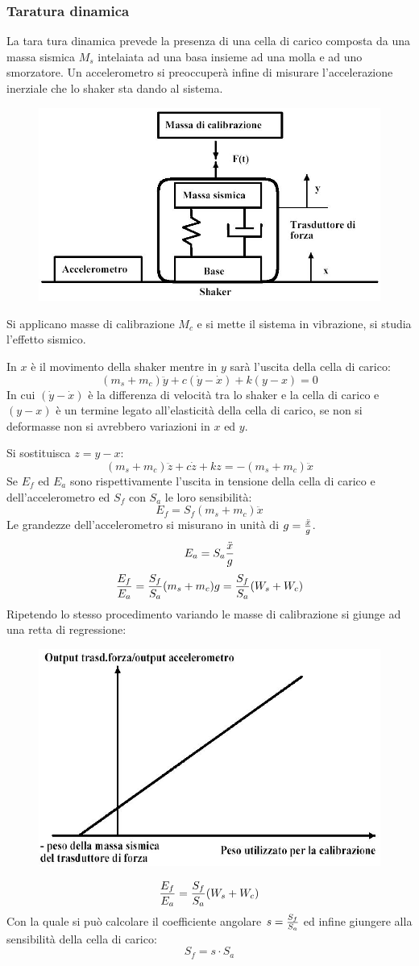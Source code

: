 \documentclass[a4paper, 15pt]{article}
\begin{document}
\subsubsection{Taratura dinamica}			
\begin{adjustwidth}{2in}{}
  		La tara tura dinamica prevede la presenza di una cella di carico composta da una massa sismica $M_s$ intelaiata ad una basa insieme ad una molla e ad uno smorzatore. Un accelerometro si preoccuperà infine di misurare l'accelerazione inerziale che lo shaker sta dando al sistema.   		
  		\begin{figure}[H]
  			\centering
  			\includegraphics[width=0.5\linewidth]{immagini/26}
  			\label{fig:26}
  		\end{figure}  		   		
  		Si applicano masse di calibrazione $M_c$ e si mette il sistema in vibrazione, si studia l'effetto sismico. \newline 
  		
  		In $x$ è il movimento della shaker mentre in $y$ sarà l'uscita della cella di carico:
  		\[(m_s+m_c)\ddot{y} + c(\dot{y}-\dot{x}) + k(y-x)=0\]
  		In cui \((\dot{y}-\dot{x})\) è la differenza di velocità tra lo shaker e la cella di carico e \((y-x)\) è un termine legato all'elasticità della cella di carico, se non si deformasse non si avrebbero variazioni in $ x $ ed $ y $. \newline 
  		
  		Si sostituisca $z=y-x$:
  		\[(m_s+m_c)\ddot{z} + c\dot{z}+kz=-(m_s+m_c)\ddot{x}\]
  		Se $ E_f $ ed $ E_a $ sono rispettivamente l’uscita in tensione della cella di carico e dell'accelerometro ed $ S_f $ con $ S_a $ le loro sensibilità: 
  		\[E_f = S_f (m_s+m_c)\ddot{x}\]
  		Le grandezze dell'accelerometro si misurano in unità di $g={\ddot{x}\over g}$.
  		\[E_a = S_a{\ddot{x}\over g}\]
  		\[{E_f\over E_a} = {S_f\over S_a }(m_s+m_c)g = {S_f\over S_a }(W_s+W_c)\]
  		Ripetendo lo stesso procedimento variando le masse di calibrazione si giunge ad una retta di regressione:  		
  		\begin{figure}[H]
  			\centering
  			\includegraphics[width=0.3\linewidth]{immagini/27}
  			\label{fig:27}
  		\end{figure}  		  		
  		\[{E_f\over E_a} = {S_f\over S_a }(W_s+W_c)\]
  		Con la quale si può calcolare il coefficiente angolare $s = {S_f\over S_a}$ ed infine giungere alla sensibilità della cella di carico: 
  		\[S_f = s\cdot S_a\]
\end{adjustwidth}
\newpage
\end{document}
